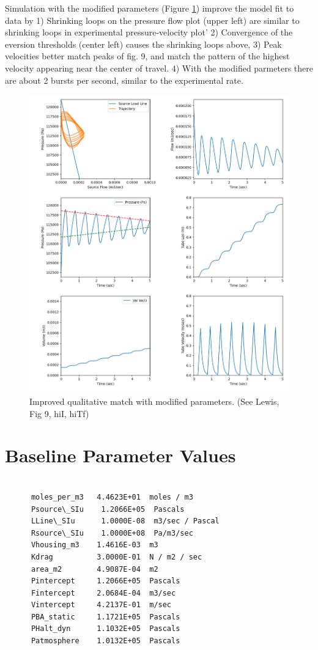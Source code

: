 \documentclass[letterpaper]{article}
\begin{document}
Simulation with the modified parameters (Figure \ref{Fig:ModifParResults}) improve the model fit to data by
    1) Shrinking loops on the pressure flow plot (upper left) are similar
  to shrinking loops in experimental pressure-velocity plot'
    2) Convergence of the eversion thresholds (center left) causes the shrinking loops above,
    3) Peak velocities better match peaks of fig. 9, and match the pattern of the highest velocity
  appearing near the center of travel.
    4) With the modified parmeters there are about 2 bursts per second, similar to the experimental rate.



\begin{figure}\centering
\includegraphics[width=.75\textwidth]{Figure_9HhiI_hiTf_tweakedParams.png}
\caption{Improved qualitative match with modified parameters.  (See Lewis, Fig 9, hiI, hiTf)}
\label{Fig:ModifParResults}
\end{figure}

\clearpage

\section{Baseline Parameter Values}\label{baselineParms}
\begin{verbatim}

      moles_per_m3   4.4623E+01  moles / m3
      Psource\_SIu    1.2066E+05  Pascals
      LLine\_SIu      1.0000E-08  m3/sec / Pascal
      Rsource\_SIu    1.0000E+08  Pa/m3/sec
      Vhousing_m3    1.4616E-03  m3
      Kdrag          3.0000E-01  N / m2 / sec
      area_m2        4.9087E-04  m2
      Pintercept     1.2066E+05  Pascals
      Fintercept     2.0684E-04  m3/sec
      Vintercept     4.2137E-01  m/sec
      PBA_static     1.1721E+05  Pascals
      PHalt_dyn      1.1032E+05  Pascals
      Patmosphere    1.0132E+05  Pascals

\end{verbatim}
\end{document}
